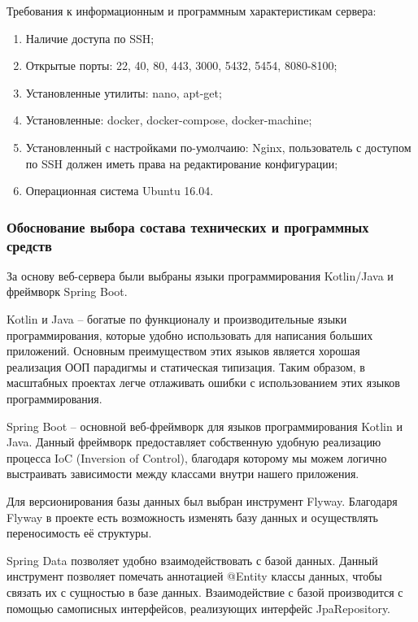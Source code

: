 \documentclass{../includes/TechDoc}
\begin{document}
    Требования к информационным и программным характеристикам сервера:
    \begin{enumerate}[noitemsep]
        \item Наличие доступа по SSH;
        \item Открытые порты: 22, 40, 80, 443, 3000, 5432, 5454, 8080-8100;
        \item Установленные утилиты: nano, apt-get;
        \item Установленные: docker, docker-compose, docker-machine;
        \item Установленный с настройками по-умолчаию: Nginx, пользователь с доступом по SSH должен иметь права
        на редактирование конфигурации;
        \item Операционная система Ubuntu 16.04.
    \end{enumerate}

    \subsubsection{Обоснование выбора состава технических и программных средств}

    За основу веб-сервера были выбраны языки программирования Kotlin/Java и фреймворк Spring Boot.

    Kotlin и Java -- богатые по функционалу и производительные языки программирования, которые удобно использовать для написания больших приложений.
    Основным преимуществом этих языков является хорошая реализация ООП парадигмы и статическая типизация.
    Таким образом, в масштабных проектах легче отлаживать ошибки с использованием этих языков программирования.

    Spring Boot -- основной веб-фреймворк для языков программирования Kotlin и Java.
    Данный фреймворк предоставляет собственную удобную реализацию процесса IoC (Inversion of Control), благодаря которому мы можем логично выстраивать зависимости между классами внутри нашего приложения.

    Для версионирования базы данных был выбран инструмент Flyway.
    Благодаря Flyway в проекте есть возможность изменять базу данных и осуществлять переносимость её структуры.

    Spring Data позволяет удобно взаимодействовать с базой данных.
    Данный инструмент позволяет помечать аннотацией @Entity классы данных, чтобы связать их с сущностью в базе данных.
    Взаимодействие с базой производится с помощью самописных интерфейсов, реализующих интерфейс JpaRepository.
\end{document}
